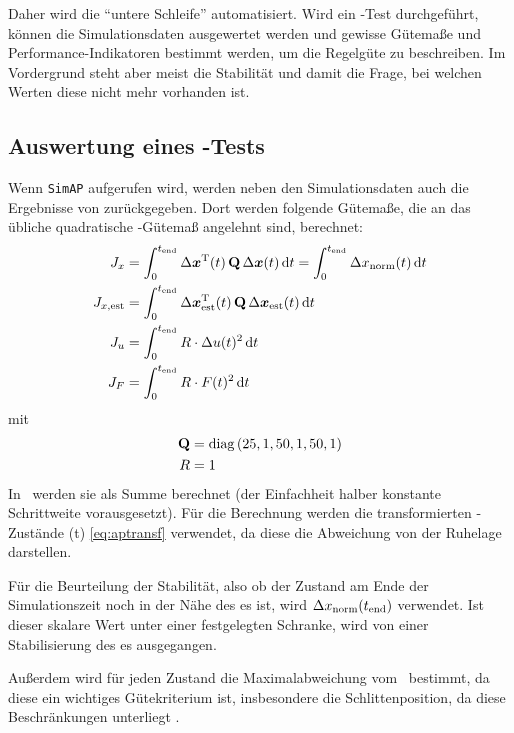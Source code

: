 Daher wird die "`untere Schleife"' automatisiert.
Wird ein \ap-Test durchgeführt, können die Simulationsdaten ausgewertet werden und gewisse Gütemaße und Performance-Indikatoren bestimmt werden, um die Regelgüte zu beschreiben.
Im Vordergrund steht aber meist die Stabilität und damit die Frage, bei welchen Werten diese nicht mehr vorhanden ist.


\subsection{Auswertung eines \ap-Tests}

Wenn \texttt{SimAP} aufgerufen wird, werden neben den Simulationsdaten auch die Ergebnisse von  zurückgegeben.
Dort werden \ua folgende Gütemaße, die an das übliche quadratische \ricc-Gütemaß angelehnt sind, berechnet:
\begin{subequations} \begin{align} 
	J_x &= \int_{0}^{t_{\mathrm{end}}} \Delta \boldsymbol{x}^{\mathrm{T}}(t) \, {\boldsymbol{\mathrm{Q}}} \, \Delta \boldsymbol{x}(t)  \, \mathrm{d} t = \int_{0}^{t_{\mathrm{end}}} \Delta x_{\mathrm{norm}}(t)  \, \mathrm{d} t  \\
	J_{x,\mathrm{est}} &= \int_{0}^{t_{\mathrm{end}}} \Delta \boldsymbol{x}_{\mathrm{est}}^{\mathrm{T}}(t)  \,{\boldsymbol{\mathrm{Q}}}  \,\Delta \boldsymbol{x}_{\mathrm{est}}(t)  \, \mathrm{d} t  \\
	J_u &= \int_{0}^{t_{\mathrm{end}}}  R \cdot \Delta u(t)^2 \, \mathrm{d} t	\\
	J_F &= \int_{0}^{t_{\mathrm{end}}}  R \cdot F(t)^2 \, \mathrm{d} t
\end{align} \end{subequations}
mit
\begin{align*}
	{\ensuremath{\boldsymbol{\mathrm{Q}}}} &= \mathrm{diag}\left(25, 1, 50, 1, 50, 1 \right) \\
	R &= 1 
\end{align*}
In \ml\ werden sie als Summe berechnet (der Einfachheit halber konstante Schrittweite vorausgesetzt).
Für die Berechnung werden die transformierten \ap-Zustände \dvex(t) \eqref{eq:aptransf} verwendet, da diese die Abweichung von der Ruhelage darstellen.

Für die Beurteilung der Stabilität, also ob der Zustand am Ende der Simulationszeit noch in der Nähe des \ap es ist, wird
$\Delta x_{\mathrm{norm}}(t_{\mathrm{end}})$
verwendet. Ist dieser skalare Wert unter einer festgelegten Schranke, wird von einer Stabilisierung des \ap es ausgegangen.

Außerdem wird für jeden Zustand die Maximalabweichung vom \ap\ bestimmt, da diese ein wichtiges Gütekriterium ist, insbesondere die Schlittenposition, da diese Beschränkungen unterliegt .

